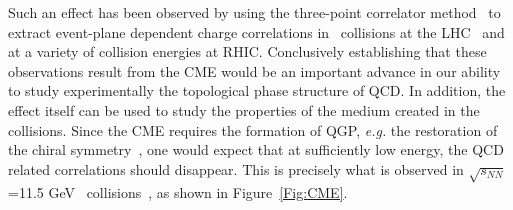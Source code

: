 Such an effect has been observed by using the three-point correlator
method~\cite{Voloshin:2004vk} to extract event-plane dependent charge
correlations in \PbPb\ collisions at the LHC~\cite{Abelev:2012pa} and
at a variety of collision energies at
RHIC\cite{Abelev:2009ac,Abelev:2009ad,Adamczyk:2014mzf}.  Conclusively
establishing that these observations result from the CME would be an
important advance in our ability to study experimentally the
topological phase structure of QCD.  In addition, the effect itself
can be used to study the properties of the medium created in the
collisions. Since the CME requires the formation of QGP, {\it e.g.}
the restoration of the chiral symmetry~\cite{Hirono:2014oda}, one
would expect that at sufficiently low energy, the QCD related
correlations should disappear. This is precisely what is observed in
$\sqrt{s_{NN}}$=11.5 GeV \AuAu\ collisions~\cite{Adamczyk:2014mzf}, as
shown in Figure~\ref{Fig:CME}.

